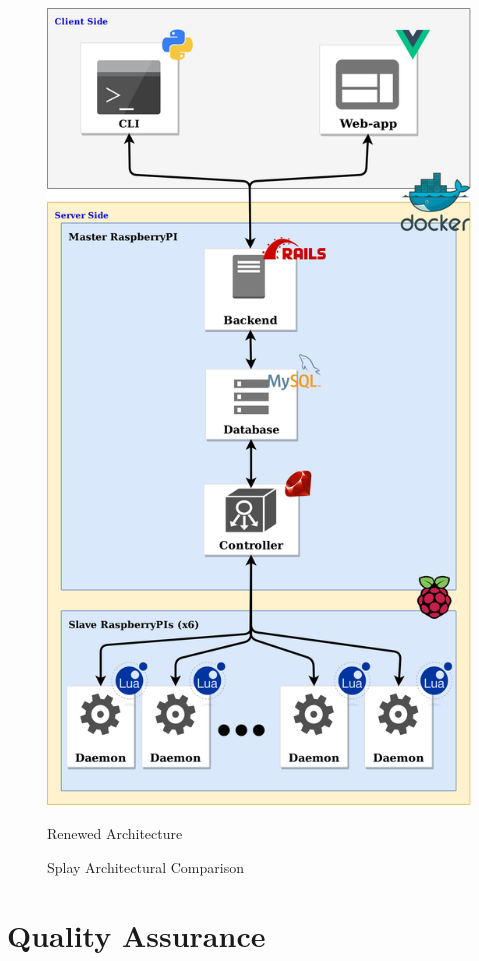 \documentclass{eplmastersthesis}
\begin{document}
\begin{figure}[!tbp]
\begin{minipage}[b]{0.45\textwidth}
          \includegraphics[width=\textwidth]{figures/new_arch.png}
          \caption{Renewed Architecture}
        \end{minipage}
        \caption{Splay Architectural Comparison}
        \label{fig:test}
      \end{figure}

  \chapter{Quality Assurance}
\end{document}
